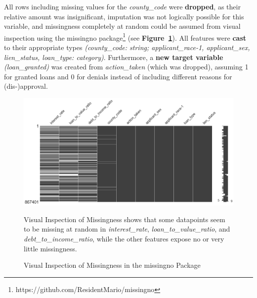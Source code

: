 All rows including missing values for the \textit{county\_code} were \textbf{dropped}, as their relative amount was insignificant, imputation was not logically possible for this variable, and missingness completely at random could be assumed from visual inspection using the missingno package\footnote{https://github.com/ResidentMario/missingno} (see \textbf{Figure~\ref{fig:CH03_Missingno_Completeness}}). 
All features were \textbf{cast} to their appropriate types \textit{(county\_code: string; applicant\_race-1, applicant\_sex, lien\_status, loan\_type: category)}. Furthermore, a \textbf{new target variable} \textit{(loan\_granted)} was created from \textit{action\_taken} (which was dropped), assuming 1 for granted loans and 0 for denials instead of including different reasons for (dis-)approval.

\begin{figure}[h]
    \centering
    \includegraphics[width=1\textwidth]{images/CH03_Missingno_Completeness.png}
    \caption{Visual Inspection of Missingness in the missingno Package}
    \medskip
    \small
    Visual Inspection of Missingness shows that some datapoints seem to be missing at random in \textit{interest\_rate}, \textit{loan\_to\_value\_ratio}, and \textit{debt\_to\_income\_ratio}, while the other features expose no or very little missingness.
    \label{fig:CH03_Missingno_Completeness}
\end{figure}

